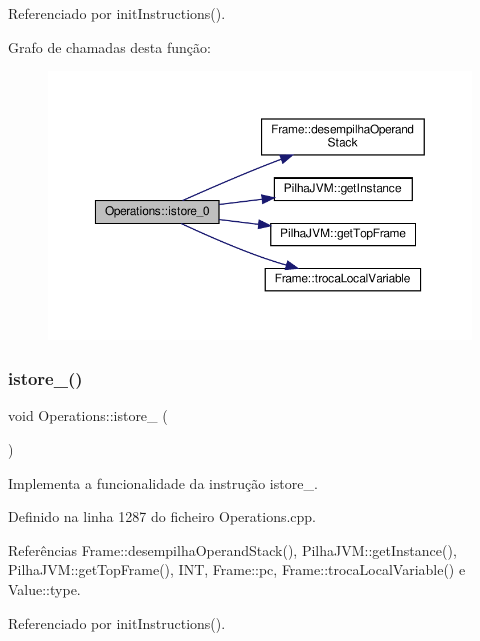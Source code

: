 Referenciado por init\+Instructions().

Grafo de chamadas desta função\+:
\nopagebreak
\begin{figure}[H]
\begin{center}
\leavevmode
\includegraphics[width=350pt]{classOperations_ae0a17c510b570467f5b025e3dcbe1398_cgraph}
\end{center}
\end{figure}
\mbox{\label{classOperations_aeb89677195b16d5c595ec9faaddc2c76}} 
\subsubsection{\texorpdfstring{istore\+\_()}{istore\_1()}}
{\footnotesize\ttfamily void Operations\+::istore\+\_ (\begin{DoxyParamCaption}{ }\end{DoxyParamCaption})\hspace{0.3cm}{\ttfamily [private]}}



Implementa a funcionalidade da instrução istore\+\_. 



Definido na linha 1287 do ficheiro Operations.\+cpp.



Referências Frame\+::desempilha\+Operand\+Stack(), Pilha\+J\+V\+M\+::get\+Instance(), Pilha\+J\+V\+M\+::get\+Top\+Frame(), I\+NT, Frame\+::pc, Frame\+::troca\+Local\+Variable() e Value\+::type.



Referenciado por init\+Instructions().

